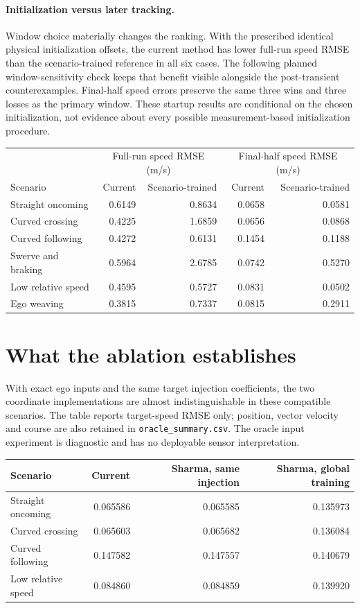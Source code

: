 \documentclass[11pt]{article}
\begin{document}
\paragraph{Initialization versus later tracking.}
Window choice materially changes the ranking. With the prescribed identical
physical initialization offsets, the current method has lower full-run speed
RMSE than the scenario-trained reference in all six cases. The following
planned window-sensitivity check keeps that benefit visible alongside the
post-transient counterexamples. Final-half speed errors preserve the same
three wins and three losses as the primary window. These startup results
are conditional on the chosen initialization, not evidence about every
possible measurement-based initialization procedure.
\begin{center}\small
\begin{tabular}{@{}lrrrr@{}}
\toprule
&\multicolumn{2}{c}{Full-run speed RMSE (m/s)}&\multicolumn{2}{c}{Final-half speed RMSE (m/s)}\\
Scenario&Current&Scenario-trained&Current&Scenario-trained\\
\midrule
Straight oncoming & 0.6149 & 0.8634 & 0.0658 & 0.0581 \\
Curved crossing & 0.4225 & 1.6859 & 0.0656 & 0.0868 \\
Curved following & 0.4272 & 0.6131 & 0.1454 & 0.1188 \\
Swerve and braking & 0.5964 & 2.6785 & 0.0742 & 0.5270 \\
Low relative speed & 0.4595 & 0.5727 & 0.0831 & 0.0502 \\
Ego weaving & 0.3815 & 0.7337 & 0.0815 & 0.2911 \\
\bottomrule
\end{tabular}\end{center}

\section{What the ablation establishes}
With exact ego inputs and the same target injection coefficients, the two
coordinate implementations are almost indistinguishable in these compatible
scenarios. The table reports target-speed RMSE only; position, vector velocity
and course are also retained in \texttt{oracle\_summary.csv}. The oracle
input experiment is diagnostic and has no deployable sensor interpretation.
\begin{center}\small
\begin{tabular}{@{}lrrr@{}}
\toprule
Scenario&Current&Sharma, same injection&Sharma, global training\\
\midrule
Straight oncoming & 0.065586 & 0.065585 & 0.135973 \\
Curved crossing & 0.065603 & 0.065682 & 0.136084 \\
Curved following & 0.147582 & 0.147557 & 0.140679 \\
Low relative speed & 0.084860 & 0.084859 & 0.139920 \\
\bottomrule
\end{tabular}\end{center}
\end{document}
